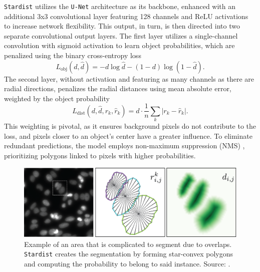 \texttt{Stardist} utilizes the \texttt{U-Net} architecture \cite{RonnebergerFB15} as its backbone, enhanced with an additional 3x3 convolutional layer featuring 128 channels and ReLU activations to increase network flexibility. This output, in turn, is then directed into two separate convolutional output layers. The first layer utilizes a single-channel convolution with sigmoid activation to learn object probabilities, which are penalized using the binary cross-entropy loss
\begin{equation}\label{eqbceloss}
	L_{\text{obj}}(d,\hat{d})=-d\log\hat{d}-(1-d)\log(1-\hat{d}).
\end{equation}
The second layer, without activation and featuring as many channels as there are radial directions, penalizes the radial distances using mean absolute error, weighted by the object probability
\begin{equation}
	L_{\text{dist}}(d,\hat{d},r_k,\hat{r}_k)=d\cdot\frac{1}{n}\sum_k|r_k-\hat{r}_k|.
\end{equation}
This weighting is pivotal, as it ensures background pixels do not contribute to the loss, and pixels closer to an object's center have a greater influence. To eliminate redundant predictions, the model employs non-maximum suppression (NMS) \cite{hosang2017learning, ren2016faster}, prioritizing polygons linked to pixels with higher probabilities.

\begin{figure}
	\centering
	\includegraphics[width=\textwidth]{"images/star_convexity_explained.png"}
	\caption[\texttt{Stardist} summarized]{Example of an area that is complicated to segment due to overlaps. \texttt{Stardist} creates the segmentation by forming star-convex polygons and computing the probability to belong to said instance. Source: \Cite{schmidt2018}.}
	\label{figstardistexplained}
\end{figure}
